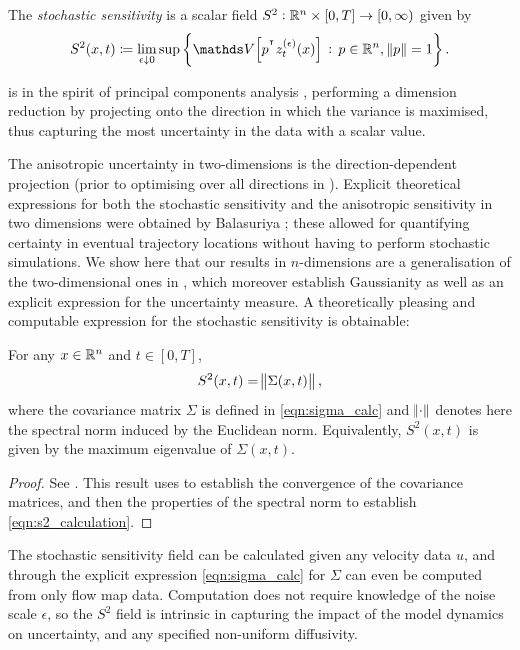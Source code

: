 \begin{definition}\label{def:ss_Rn}
	The \emph{stochastic sensitivity} is a scalar field \(S^2: \mathbb{R}^n \times [0,T] \to \left[0, \infty\right)\) given by
	\begin{equation*}
		S^2(x,t) \coloneqq \lim_{\epsilon\downarrow 0}\sup\set{\var{p^{\T}z_t^{(\epsilon)}(x)} \,: \, p \in \R^n, \, \norm{p} = 1}.
	\end{equation*}
\end{definition}

 is in the spirit of principal components analysis \cite{Jolliffe_2002_PrincipalComponentAnalysis}, performing a dimension reduction by projecting onto the direction in which the variance is maximised, thus capturing the most uncertainty in the data with a scalar value.

The anisotropic uncertainty in two-dimensions \cite{Balasuriya_2020_StochasticSensitivityComputable} is the direction-dependent projection (prior to optimising over all directions in ).
Explicit theoretical expressions for both the stochastic sensitivity and the anisotropic sensitivity in two dimensions were obtained by Balasuriya \cite{Balasuriya_2020_StochasticSensitivityComputable}; these allowed for quantifying certainty in eventual trajectory locations without having to perform stochastic simulations.
We show here that our results in \(n\)-dimensions are a generalisation of the two-dimensional ones in \cite{Balasuriya_2020_StochasticSensitivityComputable}, which moreover establish Gaussianity as well as an explicit expression for the uncertainty measure.
A theoretically pleasing and computable expression for the stochastic sensitivity is obtainable:


\begin{theorem}[Computation of \(S^2\)]\label{thm:s2_calculation}
	For any \(x \in \mathbb{R}^n\) and \(t \in [0,T]\),
	\begin{equation}
		S^2(x,t) = \norm{\Sigma(x,t)},
		\label{eqn:s2_calculation}
	\end{equation}
	where the covariance matrix $ \Sigma $ is defined in \eqref{eqn:sigma_calc} and \(\norm{\cdot}\) denotes here the spectral norm induced by the Euclidean norm.
	Equivalently, \(S^2(x,t)\) is given by the maximum eigenvalue of \(\Sigma(x,t)\).
\end{theorem}
\begin{proof}
	See .
	This result uses  to establish the convergence of the covariance matrices, and then the properties of the spectral norm to establish \eqref{eqn:s2_calculation}.
\end{proof}
The stochastic sensitivity field can be calculated given any velocity data \(u\), and through the explicit expression \eqref{eqn:sigma_calc} for \(\Sigma\) can even be computed from only flow map data.
Computation does not require knowledge of the noise scale \(\epsilon\), so the \(S^2\) field is intrinsic in capturing the impact of the model dynamics on uncertainty, and any specified non-uniform diffusivity.


